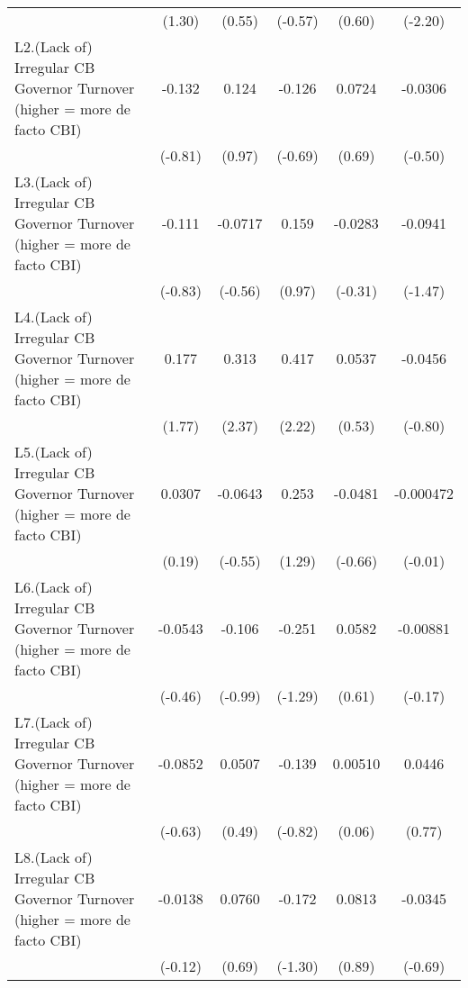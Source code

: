 {\begin{longtable}{l*{5}{c}}
                &   (1.30)         &   (0.55)         &  (-0.57)         &   (0.60)         &  (-2.20)         \\
[1em]
L2.(Lack of) Irregular CB Governor Turnover (higher = more de facto CBI)&   -0.132         &    0.124         &   -0.126         &   0.0724         &  -0.0306         \\
                &  (-0.81)         &   (0.97)         &  (-0.69)         &   (0.69)         &  (-0.50)         \\
[1em]
L3.(Lack of) Irregular CB Governor Turnover (higher = more de facto CBI)&   -0.111         &  -0.0717         &    0.159         &  -0.0283         &  -0.0941         \\
                &  (-0.83)         &  (-0.56)         &   (0.97)         &  (-0.31)         &  (-1.47)         \\
[1em]
L4.(Lack of) Irregular CB Governor Turnover (higher = more de facto CBI)&    0.177         &    0.313\sym{*}  &    0.417\sym{*}  &   0.0537         &  -0.0456         \\
                &   (1.77)         &   (2.37)         &   (2.22)         &   (0.53)         &  (-0.80)         \\
[1em]
L5.(Lack of) Irregular CB Governor Turnover (higher = more de facto CBI)&   0.0307         &  -0.0643         &    0.253         &  -0.0481         &-0.000472         \\
                &   (0.19)         &  (-0.55)         &   (1.29)         &  (-0.66)         &  (-0.01)         \\
[1em]
L6.(Lack of) Irregular CB Governor Turnover (higher = more de facto CBI)&  -0.0543         &   -0.106         &   -0.251         &   0.0582         & -0.00881         \\
                &  (-0.46)         &  (-0.99)         &  (-1.29)         &   (0.61)         &  (-0.17)         \\
[1em]
L7.(Lack of) Irregular CB Governor Turnover (higher = more de facto CBI)&  -0.0852         &   0.0507         &   -0.139         &  0.00510         &   0.0446         \\
                &  (-0.63)         &   (0.49)         &  (-0.82)         &   (0.06)         &   (0.77)         \\
[1em]
L8.(Lack of) Irregular CB Governor Turnover (higher = more de facto CBI)&  -0.0138         &   0.0760         &   -0.172         &   0.0813         &  -0.0345         \\
                &  (-0.12)         &   (0.69)         &  (-1.30)         &   (0.89)         &  (-0.69)         \\

\end{longtable}}
